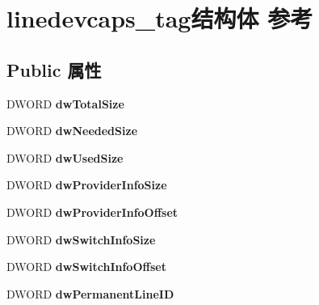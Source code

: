 \hypertarget{structlinedevcaps__tag}{}\section{linedevcaps\+\_\+tag结构体 参考}
\label{structlinedevcaps__tag}
\subsection*{Public 属性}
\begin{DoxyCompactItemize}
\item 
\mbox{\label{structlinedevcaps__tag_a7114ac296c2fba6fb61ea93807f5fc21}} 
D\+W\+O\+RD {\bfseries dw\+Total\+Size}
\item 
\mbox{\label{structlinedevcaps__tag_a9a5a492e8c6448d69a12f8059397b9f1}} 
D\+W\+O\+RD {\bfseries dw\+Needed\+Size}
\item 
\mbox{\label{structlinedevcaps__tag_ac1c774b21d75267615d879ab4a4f2388}} 
D\+W\+O\+RD {\bfseries dw\+Used\+Size}
\item 
\mbox{\label{structlinedevcaps__tag_aecaee07da21b5c87b447886c42d9b384}} 
D\+W\+O\+RD {\bfseries dw\+Provider\+Info\+Size}
\item 
\mbox{\label{structlinedevcaps__tag_a542d8b50ed714739912ca570e7517e57}} 
D\+W\+O\+RD {\bfseries dw\+Provider\+Info\+Offset}
\item 
\mbox{\label{structlinedevcaps__tag_af28826211bfdd520cade38ca5d5024e7}} 
D\+W\+O\+RD {\bfseries dw\+Switch\+Info\+Size}
\item 
\mbox{\label{structlinedevcaps__tag_a41db930f0cda9fea2b99d0f49bcf2f0d}} 
D\+W\+O\+RD {\bfseries dw\+Switch\+Info\+Offset}
\item 
\mbox{\label{structlinedevcaps__tag_a3455bde51a996909d8507a379ee54419}} 
D\+W\+O\+RD {\bfseries dw\+Permanent\+Line\+ID}
\item 
\mbox{\label{structlinedevcaps__tag_af7aaa4208c60a89fdfe3c612c69c3628}} 

\end{DoxyCompactItemize}
